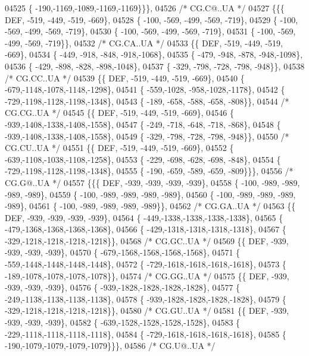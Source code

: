 \begin{DoxyCode}
04525 \{ -190,-1169,-1089,-1169,-1169\}\}\},
04526 \textcolor{comment}{/* CG.C@..UA */}
04527 \{\{\{  DEF, -519, -449, -519, -669\},
04528 \{ -100, -569, -499, -569, -719\},
04529 \{ -100, -569, -499, -569, -719\},
04530 \{ -100, -569, -499, -569, -719\},
04531 \{ -100, -569, -499, -569, -719\}\},
04532 \textcolor{comment}{/* CG.CA..UA */}
04533 \{\{  DEF, -519, -449, -519, -669\},
04534 \{ -449, -918, -848, -918,-1068\},
04535 \{ -479, -948, -878, -948,-1098\},
04536 \{ -429, -898, -828, -898,-1048\},
04537 \{ -329, -798, -728, -798, -948\}\},
04538 \textcolor{comment}{/* CG.CC..UA */}
04539 \{\{  DEF, -519, -449, -519, -669\},
04540 \{ -679,-1148,-1078,-1148,-1298\},
04541 \{ -559,-1028, -958,-1028,-1178\},
04542 \{ -729,-1198,-1128,-1198,-1348\},
04543 \{ -189, -658, -588, -658, -808\}\},
04544 \textcolor{comment}{/* CG.CG..UA */}
04545 \{\{  DEF, -519, -449, -519, -669\},
04546 \{ -939,-1408,-1338,-1408,-1558\},
04547 \{ -249, -718, -648, -718, -868\},
04548 \{ -939,-1408,-1338,-1408,-1558\},
04549 \{ -329, -798, -728, -798, -948\}\},
04550 \textcolor{comment}{/* CG.CU..UA */}
04551 \{\{  DEF, -519, -449, -519, -669\},
04552 \{ -639,-1108,-1038,-1108,-1258\},
04553 \{ -229, -698, -628, -698, -848\},
04554 \{ -729,-1198,-1128,-1198,-1348\},
04555 \{ -190, -659, -589, -659, -809\}\}\},
04556 \textcolor{comment}{/* CG.G@..UA */}
04557 \{\{\{  DEF, -939, -939, -939, -939\},
04558 \{ -100, -989, -989, -989, -989\},
04559 \{ -100, -989, -989, -989, -989\},
04560 \{ -100, -989, -989, -989, -989\},
04561 \{ -100, -989, -989, -989, -989\}\},
04562 \textcolor{comment}{/* CG.GA..UA */}
04563 \{\{  DEF, -939, -939, -939, -939\},
04564 \{ -449,-1338,-1338,-1338,-1338\},
04565 \{ -479,-1368,-1368,-1368,-1368\},
04566 \{ -429,-1318,-1318,-1318,-1318\},
04567 \{ -329,-1218,-1218,-1218,-1218\}\},
04568 \textcolor{comment}{/* CG.GC..UA */}
04569 \{\{  DEF, -939, -939, -939, -939\},
04570 \{ -679,-1568,-1568,-1568,-1568\},
04571 \{ -559,-1448,-1448,-1448,-1448\},
04572 \{ -729,-1618,-1618,-1618,-1618\},
04573 \{ -189,-1078,-1078,-1078,-1078\}\},
04574 \textcolor{comment}{/* CG.GG..UA */}
04575 \{\{  DEF, -939, -939, -939, -939\},
04576 \{ -939,-1828,-1828,-1828,-1828\},
04577 \{ -249,-1138,-1138,-1138,-1138\},
04578 \{ -939,-1828,-1828,-1828,-1828\},
04579 \{ -329,-1218,-1218,-1218,-1218\}\},
04580 \textcolor{comment}{/* CG.GU..UA */}
04581 \{\{  DEF, -939, -939, -939, -939\},
04582 \{ -639,-1528,-1528,-1528,-1528\},
04583 \{ -229,-1118,-1118,-1118,-1118\},
04584 \{ -729,-1618,-1618,-1618,-1618\},
04585 \{ -190,-1079,-1079,-1079,-1079\}\}\},
04586 \textcolor{comment}{/* CG.U@..UA */}

\end{DoxyCode}
